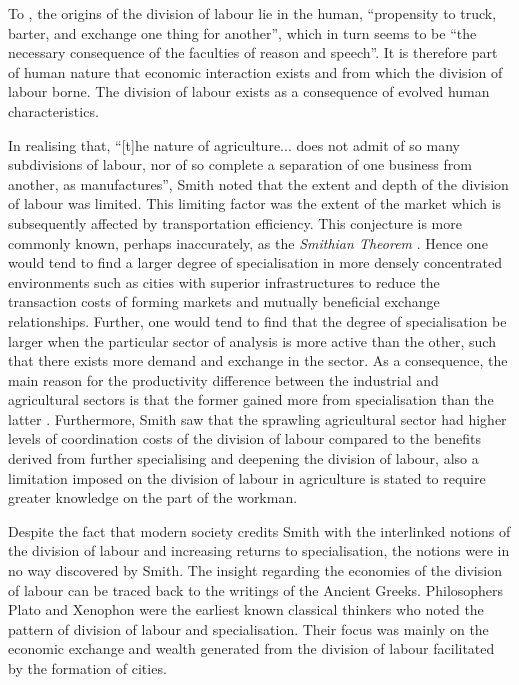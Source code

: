 To \citet[p.~13]{Smith1776}, the origins of the division of labour lie in the human, ``propensity to truck, barter, and exchange one thing for another'', which in turn seems to be ``the necessary consequence of the faculties of reason and speech''. It is therefore part of human nature that economic interaction exists and from which the division of labour borne. The division of labour exists as a consequence of evolved human characteristics.

In realising that, ``[t]he nature of agriculture... does not admit of so many subdivisions of labour, nor of so complete a separation of one business from another, as manufactures'', Smith noted that the extent and depth of the division of labour was limited. This limiting factor was the extent of the market which is subsequently affected by transportation efficiency. This conjecture is more commonly known, perhaps inaccurately, as the \textit{Smithian Theorem} \citep{Stigler1951}. Hence one would tend to find a larger degree of specialisation in more densely concentrated environments such as cities with superior infrastructures to reduce the transaction costs of forming markets and mutually beneficial exchange relationships. Further, one would tend to find that the degree of specialisation be larger when the particular sector of analysis is more active than the other, such that there exists more demand and exchange in the sector. As a consequence, the main reason for the productivity difference between the industrial and agricultural sectors is that the former gained more from specialisation than the latter \citep[p.~18]{Smith1776}. Furthermore, Smith saw that the sprawling agricultural sector had higher levels of coordination costs of the division of labour compared to the benefits derived from further specialising and deepening the division of labour, also a limitation imposed on the division of labour in agriculture is stated to require greater knowledge on the part of the workman.

Despite the fact that modern society credits Smith with the interlinked notions of the division of labour and increasing returns to specialisation, the notions were in no way discovered by Smith. The insight regarding the economies of the division of labour can be traced back to the writings of the Ancient Greeks. Philosophers Plato and Xenophon were the earliest known classical thinkers who noted the pattern of division of labour and specialisation. Their focus was mainly on the economic exchange and wealth generated from the division of labour facilitated by the formation of cities.

